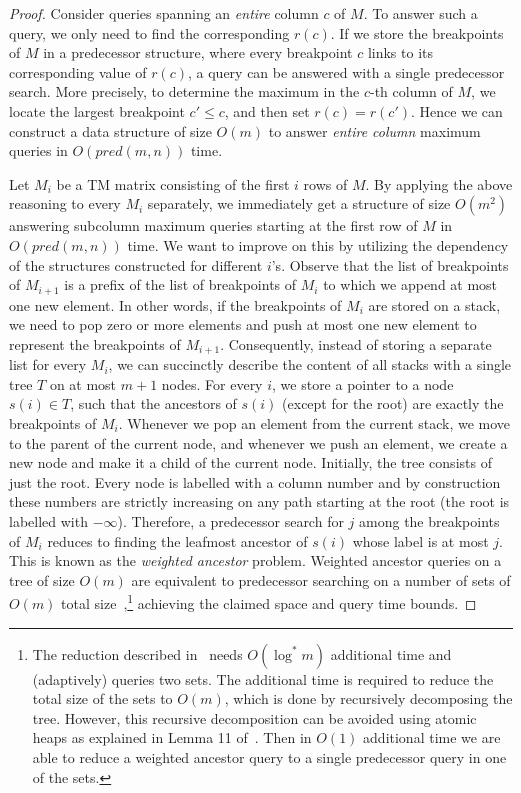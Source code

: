 \documentclass{llncs}
\newcommand{\pred}[1]{pred(#1)}
\begin{document}
\begin{proof}
Consider queries spanning an {\em entire} column $c$ of $M$. To answer such a query, we only need to find
the corresponding $r(c)$. If we store the breakpoints of $M$ in a predecessor structure, where
every breakpoint $c$ links to its corresponding value of $r(c)$, a query can be answered
with a single predecessor search. More precisely, to determine the maximum in the $c$-th
column of $M$, we locate the largest breakpoint $c' \leq c$, and then set $r(c)=r(c')$.
Hence we can construct a data structure of size $O(m)$ to answer {\em entire column} maximum
queries in $O(\pred{m,n})$ time.

Let $M_{i}$ be a TM matrix consisting of the first $i$ rows of $M$. By applying the above
reasoning to every $M_{i}$ separately, we immediately get a structure of size $O(m^{2})$ answering
subcolumn maximum queries starting at the first row of $M$ in $O(\pred{m,n})$ time. We
want to improve on this by utilizing the dependency of the structures constructed for different $i$'s. Observe that the list of breakpoints of $M_{i+1}$ is a prefix
of the list of breakpoints of $M_{i}$ to which we append at most one new element. In other words,
if the breakpoints of $M_i$ are stored on a stack, we need to pop zero or more elements and push
at most one new element to represent the breakpoints of $M_{i+1}$. Consequently, instead of storing a separate list for every $M_{i}$,
we can succinctly describe the content of all stacks with a single tree $T$ on at most $m+1$
nodes. For every $i$, we store a pointer to a node $s(i)\in T$, such that the ancestors of $s(i)$
(except for the root) are exactly the breakpoints of $M_{i}$.
Whenever we pop an element from the current stack, we move to the parent of the current
node, and whenever we push an element, we create a new node and make it a child of the
current node. Initially, the tree consists of just the root. Every node is labelled with a column
number and by construction these numbers are strictly increasing on any path starting at
the root (the root is labelled with $-\infty$). 
Therefore, a predecessor search for $j$ among the 
breakpoints of $M_{i}$ reduces to finding the leafmost ancestor of $s(i)$ whose label is at most $j$. 
This is known as the {\em weighted ancestor} problem.
Weighted ancestor queries on a tree of size $O(m)$
are equivalent to predecessor searching on a number of sets of $O(m)$
total size~\cite{Kopelowitz},\footnote{The reduction described in~\cite{Kopelowitz}
needs $O(\log^{*}m)$ additional time and (adaptively) queries two sets. The additional
time is required to reduce the total size of the sets to $O(m)$, which is done
by recursively decomposing the tree. However, this recursive decomposition
can be avoided using atomic heaps as explained in Lemma 11 of~\cite{GawrychowskiLN14}.
Then in $O(1)$ additional time we are able to reduce a weighted ancestor query
to a single predecessor query in one of the sets.}
achieving the claimed space and query time bounds.


\end{proof}
\end{document}
